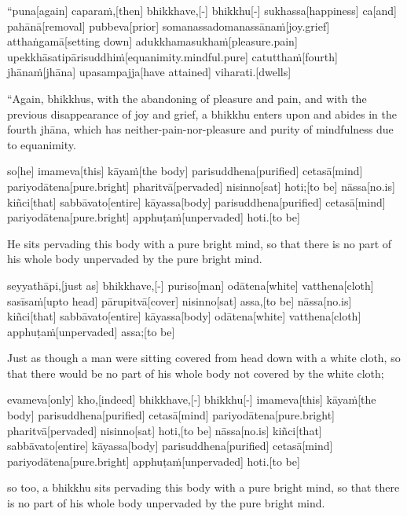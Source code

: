\vskip 0.2in
\begin{samepage}
\begingl[glneveryline={\PaliGlossA,\PaliGlossB}]
“puna[again] caparaṁ,[then] bhikkhave,[-] bhikkhu[-] sukhassa[happiness] ca[and] pahānā[removal] pubbeva[prior] somanassadomanassānaṁ[joy.grief] atthaṅgamā[setting down] adukkhamasukhaṁ[pleasure.pain] upekkhāsatipārisuddhiṁ[equanimity.mindful.pure] catutthaṁ[fourth] jhānaṁ[jhāna] upasampajja[have attained] viharati.[dwells]
\endgl
\nopagebreak
\linespread{0.5}
\begin{spacin}{0.2}
{\PaliGlossFT “Again, bhikkhus, with the abandoning of pleasure and pain, and with the previous disappearance of joy and grief, a bhikkhu enters upon and abides in the fourth jhāna, which has neither-pain-nor-pleasure and purity of mindfulness due to equanimity.}
\end{spacin}
\vskip 12pt
\end{samepage}
\begin{samepage}
\begingl[glneveryline={\PaliGlossA,\PaliGlossB}]
so[he] imameva[this] kāyaṁ[the body] parisuddhena[purified] cetasā[mind] pariyodātena[pure.bright] pharitvā[pervaded] nisinno[sat] hoti;[to be] nāssa[no.is] kiñci[that] sabbāvato[entire] kāyassa[body] parisuddhena[purified] cetasā[mind] pariyodātena[pure.bright] apphuṭaṁ[unpervaded] hoti.[to be]
\endgl
\nopagebreak
\linespread{0.5}
\begin{spacin}{0.2}
{\PaliGlossFT He sits pervading this body with a pure bright mind, so that there is no part of his whole body unpervaded by the pure bright mind.}
\end{spacin}
\vskip 12pt
\end{samepage}
\begin{samepage}
\begingl[glneveryline={\PaliGlossA,\PaliGlossB}]
seyyathāpi,[just as] bhikkhave,[-] puriso[man] odātena[white] vatthena[cloth] sasīsaṁ[upto head] pārupitvā[cover] nisinno[sat] assa,[to be] nāssa[no.is] kiñci[that] sabbāvato[entire] kāyassa[body] odātena[white] vatthena[cloth] apphuṭaṁ[unpervaded] assa;[to be]
\endgl
\nopagebreak
\linespread{0.5}
\begin{spacin}{0.2}
{\PaliGlossFT Just as though a man were sitting covered from head down with a white cloth, so that there would be no part of his whole body not covered by the white cloth;}
\end{spacin}
\vskip 12pt
\end{samepage}
\begin{samepage}
\begingl[glneveryline={\PaliGlossA,\PaliGlossB}]
evameva[only] kho,[indeed] bhikkhave,[-] bhikkhu[-] imameva[this] kāyaṁ[the body] parisuddhena[purified] cetasā[mind] pariyodātena[pure.bright] pharitvā[pervaded] nisinno[sat] hoti,[to be] nāssa[no.is] kiñci[that] sabbāvato[entire] kāyassa[body] parisuddhena[purified] cetasā[mind] pariyodātena[pure.bright] apphuṭaṁ[unpervaded] hoti.[to be]
\endgl
\nopagebreak
\linespread{0.5}
\begin{spacin}{0.2}
{\PaliGlossFT so too, a bhikkhu sits pervading this body with a pure bright mind, so that there is no part of his whole body unpervaded by the pure bright mind.}
\end{spacin}
\vskip 12pt
\end{samepage}
